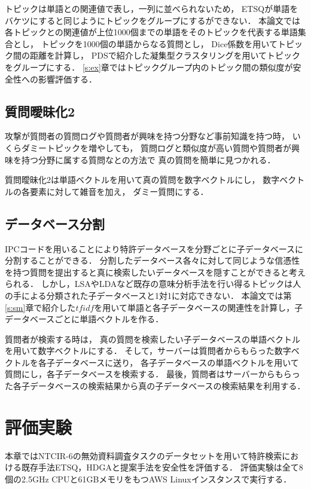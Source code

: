 \documentclass[master]{suribt}
\theoremstyle{definition}
\begin{document}
 トピックは単語との関連値で表し，一列に並べられないため，
 ETSQが単語をバケツにすると同じようにトピックをグループにするができない．
 本論文では各トピックとの関連値が上位1000個までの単語をそのトピックを代表する単語集合とし，
 トピックを1000個の単語からなる質問とし，
 Dice係数を用いてトピック間の距離を計算し，
 PDSで紹介した凝集型クラスタリングを用いてトピックをグループにする．
 \ref{s:ex}章ではトピックグループ内のトピック間の類似度が安全性への影響評価する．

 
 \section{質問曖昧化2}
 攻撃が質問者の質問ログや質問者が興味を持つ分野など事前知識を持つ時，
 いくらダミートピックを増やしても，
 質問ログと類似度が高い質問や質問者が興味を持つ分野に属する質問なとの方法で
 真の質問を簡単に見つかれる．

 質問曖昧化2は単語ベクトルを用いて真の質問を数字ベクトルにし，
 数字ベクトルの各要素に対して雑音を加え，
 ダミー質問にする．

 
 \section{データベース分割}
 IPCコードを用いることにより特許データベースを分野ごとに子データベースに分割することができる．
 分割したデータベース各々に対して同じような信憑性を持つ質問を提出すると真に検索したいデータベースを隠すことができると考えられる．
 しかし，LSAやLDAなど既存の意味分析手法を行い得るトピックは人の手による分類された子データベースと1対1に対応できない．
 本論文では第\ref{s:sm}章で紹介した$tfidf$を用いて単語と各子データベースの関連性を計算し，子データベースごとに単語ベクトルを作る．

 質問者が検索する時は，
 真の質問を検索したい子データベースの単語ベクトルを用いて数字ベクトルにする．
 そして，サーバーは質問者からもらった数字ベクトルを各子データベースに送り，
 各子データベースの単語ベクトルを用いて質問にし，各子データベースを検索する．
 最後，質問者はサーバーからもらった各子データベースの検索結果から真の子データベースの検索結果を利用する．
 
 \chapter{評価実験}
 本章ではNTCIR-6\cite{}の無効資料調査タスクのデータセットを用いて特許検索における既存手法ETSQ，HDGAと提案手法を安全性を評価する．
 評価実験は全て8個の2.5GHz CPUと61GBメモリをもつAWS Linuxインスタンスで実行する．
\end{document}

